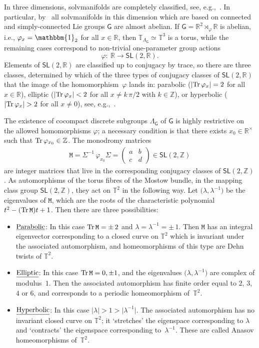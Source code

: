 \documentclass[10pt,a4paper]{amsart}
\numberwithin{equation}{section}
\newcommand{\Z}{\zed}
\newcommand{\unit}{\mathbbm{1}} 			%
\newcommand{\sfG}{\mathsf{G}}
\newcommand{\sfSL}{\mathsf{SL}}
\newcommand{\ttM}{\mathtt{M}}
\newcommand{\R}{\real}
\newcommand{\zed}{{\mathbb Z}} %
\newcommand{\real}{{\mathbb R}} %
\newcommand{\torus}{{\mathbb T}} %
\newcommand{\Tr}[1]{{\rm Tr}\,#1}
\begin{document}
In three dimensions, solvmanifolds are completely
classified, see, e.g.,~\cite{Bock2009}. In particular,
by~\cite[Proposition~5.1]{Bock2009} all solvmanifolds in
this dimension which are based on connected and simply-connected Lie groups
$\sfG$ are almost abelian. If $\sfG=\R^2\rtimes_\varphi\R$ is
abelian, i.e., $\varphi_x=\unit_2$ for all $x\in\R$, then $\torus_{\Lambda_\sfG}\simeq\torus^3$ is a torus, while
the remaining cases correspond to non-trivial one-parameter group actions
\[
\varphi\colon \ \R\longrightarrow\sfSL(2,\real) .
\]
Elements of $\sfSL(2,\R)$ are classified up to conjugacy by trace, so there are three classes, determined by which of the three types
of conjugacy classes of $\sfSL(2,\real)$ that
the image of the homomorphism~$\varphi$ lands in: parabolic
($|\Tr\varphi_x|=2$ for all $x\in\R$), elliptic ($|\Tr\varphi_x|<2$
for all $x\not=k\,\pi/2$ with $k\in \mathbb{Z}$),
or hyperbolic ($|\Tr\varphi_x|>2$ for all
$x\not=0$), see, e.g.,~\cite{Hull2005}.

The existence of cocompact discrete subgroups $\Lambda_\sfG$ of $\sfG$ is highly
restrictive on the allowed homomorphisms $\varphi$; a necessary condition is that there exists
$x_0\in\R^\times$ such that $\Tr\varphi_{x_0}\in\Z$. The monodromy matrices
\begin{gather}\label{eq:monodromy3d}
\ttM=\Sigma^{-1}\,\varphi_{x_0} \Sigma=\left(\begin{matrix} a & b \\
 c & d \end{matrix}\right) \in \sfSL(2,\Z)
\end{gather}
are integer matrices that live in the corresponding conjugacy classes
of $\sfSL(2,\Z)$. As automorphisms of the torus fibres of the Mostow bundle, in the mapping
class group $\sfSL(2,\Z)$, they act on $\torus^2$ in the following
way. Let $\big(\lambda,\lambda^{-1}\big)$ be the eigenvalues of $\ttM$, which
are the roots of the characteristic polynomial $t^2-(\Tr\ttM) t+1$. Then
there are three possibilities:
\begin{itemize}\itemsep=0pt
\item{$\underline{\rm Parabolic}$:} In this case
 $\Tr\ttM=\pm\,2$ and $\lambda=\lambda^{-1}=\pm\,1$. Then $\ttM$ has
 an integral eigenvector corresponding to a closed curve on
 $\torus^2$ which is invariant under the
 associated automorphism, and homeomorphisms of this type are Dehn twists of
 $\torus^2$.
\item{$\underline{\rm Elliptic}$:} In this case $\Tr\ttM=0,\pm 1$,
 and the eigenvalues $\big(\lambda,\lambda^{-1}\big)$ are complex of
 modulus~$1$. Then the associated automorphism has finite order
 equal to $2$, $3$, $4$ or $6$, and corresponds to a periodic
 homeomorphism of~$\torus^2$.
\item{$\underline{\rm Hyperbolic}$:} In this case
 $|\lambda|>1>\big|\lambda^{-1}\big|$. The associated automorphism has no
 invariant closed curve on $\torus^2$; it `stretches' the
 eigenspace corresponding to $\lambda$ and `contracts' the eigenspace
 corresponding to~$\lambda^{-1}$. These are called Anasov homeomorphisms of~$\torus^2$.
\end{itemize}
\end{document}
